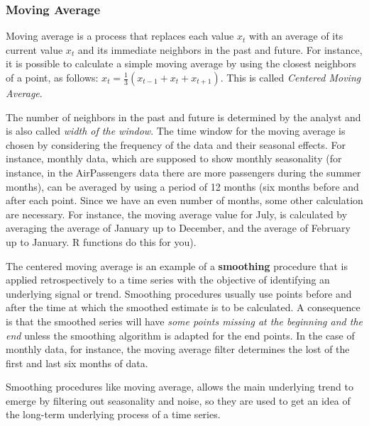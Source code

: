 \documentclass[
]{article}
\begin{document}
\subsubsection{Moving Average}\label{moving-average}

Moving average is a process that replaces each value \(x_{t}\) with an average of its current value \(x_{t}\) and its immediate neighbors in the past and future. For instance, it is possible to calculate a simple moving average by using the closest neighbors of a point, as follows: \(x_{t} = \frac{1}{3} (x_{t-1} + x_{t} + x_{t+1})\). This is called \emph{Centered Moving Average}.

The number of neighbors in the past and future is determined by the analyst and is also called \emph{width of the window}. The time window for the moving average is chosen by considering the frequency of the data and their seasonal effects. For instance, monthly data, which are supposed to show monthly seasonality (for instance, in the AirPassengers data there are more passengers during the summer months), can be averaged by using a period of 12 months (six months before and after each point. Since we have an even number of months, some other calculation are necessary. For instance, the moving average value for July, is calculated by averaging the average of January up to December, and the average of February up to January. R functions do this for you).

The centered moving average is an example of a \textbf{smoothing} procedure that is applied retrospectively to a time series with the objective of identifying an underlying signal or trend. Smoothing procedures usually use points before and after the time at which the smoothed estimate is to be calculated. A consequence is that the smoothed series will have \emph{some points missing at the beginning and the end} unless the smoothing algorithm is adapted for the end points. In the case of monthly data, for instance, the moving average filter determines the lost of the first and last six months of data.

Smoothing procedures like moving average, allows the main underlying trend to emerge by filtering out seasonality and noise, so they are used to get an idea of the long-term underlying process of a time series.
\end{document}
